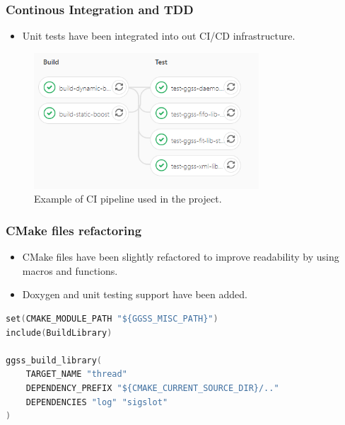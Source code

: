 \documentclass[10pt]{beamer}
\begin{document}
\begin{frame}[fragile]
\frametitle{Continous Integration and TDD}
\begin{itemize}
\item Unit tests have been integrated into out CI/CD infrastructure.
\end{itemize}
\begin{figure}
\centering
\includegraphics[width=0.75\textwidth]{resources/pipeline_example.png}
\caption{Example of CI pipeline used in the project.}
\end{figure}
\end{frame}


\begin{frame}[fragile]
\frametitle{CMake files refactoring}
\begin{itemize}
\item CMake files have been slightly refactored to improve readability by using macros and functions.
\item Doxygen and unit testing support have been added.
\end{itemize}
\begin{lstlisting}[language=c++, caption={New version of CMake used for building \emph{thread-lib}}]
set(CMAKE_MODULE_PATH "${GGSS_MISC_PATH}")
include(BuildLibrary)

ggss_build_library(
    TARGET_NAME "thread"
    DEPENDENCY_PREFIX "${CMAKE_CURRENT_SOURCE_DIR}/.."
    DEPENDENCIES "log" "sigslot"
)
\end{lstlisting}
\end{frame}
\end{document}
